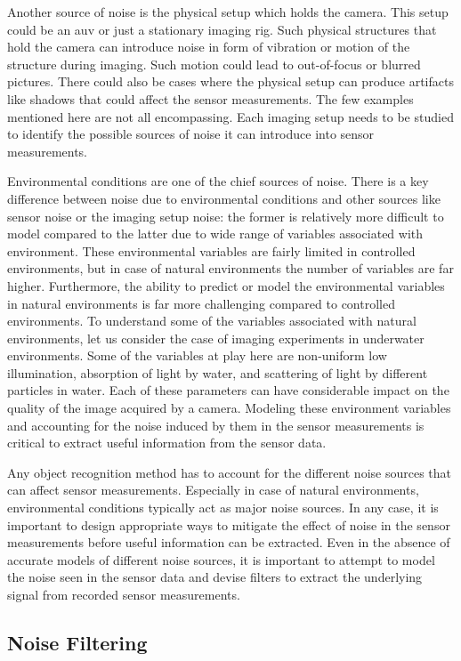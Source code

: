 \documentclass {udthesis}
\begin{document}
Another source of noise is the physical setup which holds the camera. This setup could be an \gls{auv} or just a stationary imaging rig. Such physical structures that hold the camera can introduce noise in form of vibration or motion of the structure during imaging. Such motion could lead to out-of-focus or blurred pictures. There could also be cases where the physical setup can produce artifacts like shadows that could affect the sensor measurements. The few examples mentioned here are not all encompassing. Each imaging setup needs to be studied to identify the possible sources of noise it can introduce into sensor measurements.

Environmental conditions are one of the chief sources of noise. 
There is a key difference between noise due to environmental conditions 
and other sources like sensor noise or the imaging setup noise: the former is relatively more difficult to model compared to the latter due to wide range of variables associated with environment. 
These environmental variables are fairly limited in controlled environments, but in case of natural environments
the number of variables are far higher. Furthermore, the ability to predict or model the environmental variables in natural
environments is far more challenging compared to controlled environments. To understand some of the variables associated with natural environments, let us consider the case of imaging experiments in underwater environments. 
Some of the variables at play here are non-uniform low illumination, absorption of light by water,
and scattering of light by different particles in water. Each of these parameters can have considerable impact on the quality of the image acquired by
a camera. Modeling these environment variables and accounting for the noise induced by them in the sensor measurements is critical to extract useful
information from the sensor data.

Any object recognition method has to account for the different noise sources that can affect sensor measurements. Especially in case of natural environments, environmental conditions typically act as major noise sources. 
In any case, it is important to design appropriate ways to mitigate the effect of noise 
in the sensor measurements before useful information can be extracted. 
Even in the absence of accurate models of different noise sources, it is important to attempt to model the noise seen in the sensor data
and devise filters to extract the underlying signal from recorded sensor measurements.

\subsection{Noise Filtering}
\label{sec:noise_filters}
\end{document}
